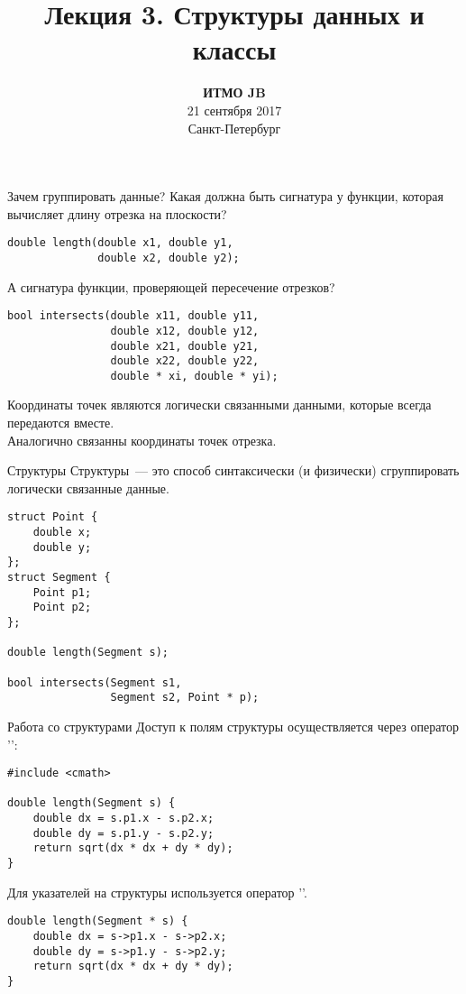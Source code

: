 \documentclass{beamer}
\title{Лекция 3. Структуры данных и классы}
\date{
   \textbf{ИТМО JB}\\
   21 сентября 2017 \\
   Санкт-Петербург
}
\begin{document}
\begin{frame} 
  \titlepage
\end{frame}

\begin{frame}[fragile]{Зачем группировать данные?}
    Какая должна быть сигнатура у функции, которая вычисляет длину отрезка на
    плоскости?
    \begin{lstlisting}
double length(double x1, double y1, 
              double x2, double y2);
    \end{lstlisting}
    А сигнатура функции, проверяющей пересечение отрезков?
    \begin{lstlisting}
bool intersects(double x11, double y11, 
                double x12, double y12,
                double x21, double y21, 
                double x22, double y22,
                double * xi, double * yi);
    \end{lstlisting}
Координаты точек являются логически связанными данными, которые всегда передаются
вместе.\\
Аналогично связанны координаты точек отрезка.
\end{frame}

\begin{frame}[fragile]{Структуры}
    Структуры~--- это способ синтаксически (и физически)
    сгруппировать логически связанные данные.
    \begin{lstlisting}
struct Point {
    double x;
    double y;
};
struct Segment {
    Point p1;
    Point p2;
};

double length(Segment s);  

bool intersects(Segment s1, 
                Segment s2, Point * p);
    \end{lstlisting}
\end{frame}

\begin{frame}[fragile]{Работа со структурами}
    Доступ к полям структуры осуществляется через
    оператор '':
    \begin{lstlisting}
#include <cmath>

double length(Segment s) {
    double dx = s.p1.x - s.p2.x;
    double dy = s.p1.y - s.p2.y;
    return sqrt(dx * dx + dy * dy);
}
    \end{lstlisting}
    Для указателей на структуры используется оператор '\code{->}'.
    \begin{lstlisting}
double length(Segment * s) {
    double dx = s->p1.x - s->p2.x;
    double dy = s->p1.y - s->p2.y;
    return sqrt(dx * dx + dy * dy);
}
    \end{lstlisting}
\end{frame}
\end{document}
